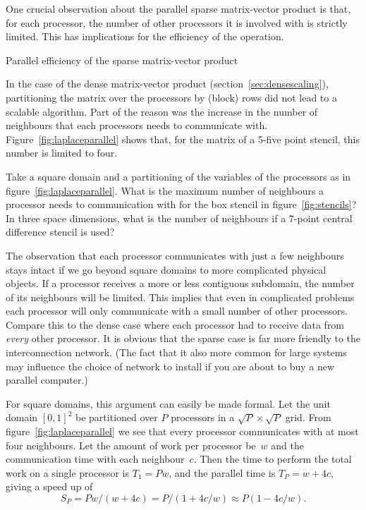 One crucial observation about the parallel sparse matrix-vector
product
is that, for each processor, the number of
other processors it is involved with is strictly limited. This has
implications for the efficiency of the operation.

 {Parallel efficiency of the sparse matrix-vector product}
\label{sec:par-spmvp}

In the case of the dense matrix-vector product
(section~\ref{sec:densescaling}), partitioning the matrix over the
processors by (block) rows did not lead to a scalable algorithm. Part
of the reason was the increase in the number of neighbours that each
processors needs to communicate with. Figure~\ref{fig:laplaceparallel}
shows that, for the matrix of a 5-five point stencil, this number is
limited to four.

\begin{exercise}
  Take a square domain and a partitioning of the variables of the
  processors as in figure~\ref{fig:laplaceparallel}.
  What is the maximum number of neighbours a
  processor needs to communication with for the box stencil in
  figure~\ref{fig:stencils}? In three space dimensions, what is the
  number of neighbours if a 7-point central difference stencil is
  used?
\end{exercise}

The observation that each processor communicates with just a few
neighbours stays intact if we go beyond square domains to more
complicated physical objects. If a processor receives a more or less
contiguous subdomain, the number of its neighbours will be
limited. This implies that even in complicated problems each processor
will only communicate with a small number of other processors. Compare
this to the dense case where each processor had to receive data from
\emph{every} other processor. It is obvious that the sparse case is
far more friendly to the interconnection network. (The fact that it
also more common for large systems may influence the choice of network
to install if you are about to buy a new parallel computer.)

For square domains, this argument can easily be made formal. Let the
unit domain $[0,1]^2$ be partitioned over $P$ processors in a $\sqrt
P\times \sqrt P$ grid. From figure~\ref{fig:laplaceparallel} we see
that every processor communicates with at most four neighbours. Let
the amount of work per processor be~$w$ and the communication time
with each neighbour~$c$. Then the time to perform the total work on a
single processor is $T_1=Pw$, and the parallel time is $T_P=w+4c$,
giving a speed up of
\[ S_P=Pw/(w+4c)=P/(1+4c/w)\approx P(1-4c/w). \]

